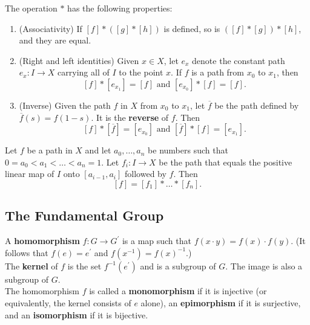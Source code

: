 \begin{theorem}
The operation $*$ has the following properties:
\begin{enumerate}
    \item (Associativity) If $[f] * ([g] * [h])$ is defined, so is $([f] * [g]) * [h]$, and they are equal.
    \item (Right and left identities) Given $x \in X$, let $e_x$ denote the constant path $e_x\colon I \rightarrow X$ carrying all of $I$ to the point $x$.
    If $f$ is a path from $x_0$ to $x_1$, then 
    \[
        [f] * [e_{x_1}] = [f] \text{ and } [e_{x_0}] * [f] = [f].
    \]
    \item (Inverse) Given the path $f$ in $X$ from $x_0$ to $x_1$, let $\overline{f}$ be the path defined by $\overline{f}(s) = f(1-s)$. It is the \textbf{reverse} of $f$. Then
    \[
        [f] * [\overline{f}] = [e_{x_0}] \text{ and } [\overline{f}] * [f] = [e_{x_1}].
    \]
\end{enumerate}
\end{theorem}

\begin{theorem}
Let $f$ be a path in $X$ and let $a_0, \dots, a_n$ be numbers such that $0 = a_0 < a_1 < \dots < a_n = 1$. Let $f_i\colon I \rightarrow X$ be the path that equals the positive linear map of $I$ onto $[a_{i-1}, a_i]$ followed by $f$. Then
\[
    [f] = [f_1] * \dots * [f_n].
\]
\end{theorem}


\subsection{The Fundamental Group}

\begin{definition}
A \textbf{homomorphism} $f\colon G \rightarrow G^{\prime}$ is a map such that $f(x \cdot y) = f(x) \cdot f(y)$. (It follows that $f(e) = e^{\prime}$ and $f(x^{-1}) = f(x)^{-1}$.) \\

The \textbf{kernel} of $f$ is the set $f^{-1}(e^{\prime})$ and is a subgroup of $G$. The image is also a subgroup of $G$. \\

The homomorphism $f$ is called a \textbf{monomorphism} if it is injective (or equivalently, the kernel consists of $e$ alone), an \textbf{epimorphism} if it is surjective,
and an \textbf{isomorphism} if it is bijective.
\end{definition}

